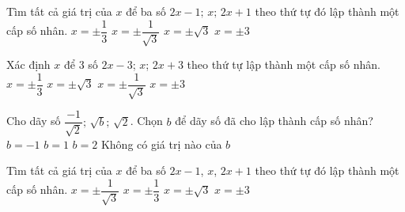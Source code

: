 \begin{ex}%
	Tìm tất cả giá trị của $x$ để ba số $2x-1;\,x;\,2x+1$ theo thứ tự đó lập thành  một cấp số nhân.
	\choice 
		 {$ x=\pm \dfrac{1}{3}$}
		{\True $ x=\pm \dfrac{1}{\sqrt {3}}$} 
		{$  x=\pm \sqrt {3}$}
		{$  x=\pm 3$}
\end{ex}

\begin{ex}%
	Xác định $ x$ để $3$ số $2x-3$;  $x$; $2x+3$ theo thứ tự lập thành một cấp số nhân.
	\choice 
		 {$x=\pm\dfrac{1}{3}$}
		{\True $x=\pm\sqrt3$} 
		 {$x=\pm\dfrac{1}{\sqrt 3}$}
		{$x=\pm 3$} 
\end{ex}

\begin{ex}%
	Cho dãy số $\dfrac{-1}{\sqrt{2}};\, \sqrt{b};\, \sqrt{2}$. Chọn $b$  để dãy số đã cho lập thành cấp số nhân?
	\choice 
		{  $b=-1$}
		{$b=1$} 
		 {$b=2$}
		{\True Không có giá trị nào của $b$} 
\end{ex}

\begin{ex}%
	Tìm tất cả giá trị của $x$ để ba số $2x-1$, $x$, $2x+1$ theo  thứ tự đó lập thành một cấp số nhân.
	 \choice
		 {\True $x=\pm \dfrac{1}{\sqrt{3}}$}
		{$x=\pm  \dfrac{1}{3}$}
		 {$x=\pm \sqrt{3}$}
		{$x=\pm  3$}
\end{ex}


